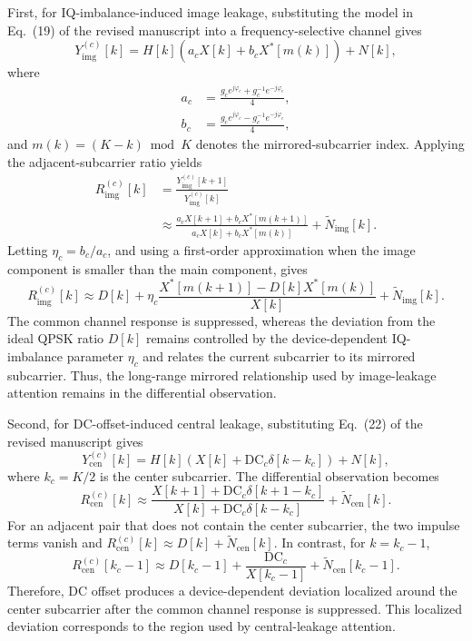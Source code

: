 \documentclass[onecolumn,11pt]{article}
\begin{document}
{First, for IQ-imbalance-induced image leakage, substituting the model in Eq.~(19) of the revised manuscript into a frequency-selective channel gives
\begin{equation}
Y_{\mathrm{img}}^{(c)}[k]
=
H[k]\left(a_cX[k]+b_cX^{*}[m(k)]\right)+N[k],
\end{equation}
where
\begin{equation}
\begin{aligned}
a_c&=\frac{g_ce^{j\varphi_c}+g_c^{-1}e^{-j\varphi_c}}{4},\\
b_c&=\frac{g_ce^{j\varphi_c}-g_c^{-1}e^{-j\varphi_c}}{4},
\end{aligned}
\end{equation}
and $m(k)=(K-k)\bmod K$ denotes the mirrored-subcarrier index. Applying the adjacent-subcarrier ratio yields
\begin{equation}
\begin{aligned}
R_{\mathrm{img}}^{(c)}[k]
&=
\frac{Y_{\mathrm{img}}^{(c)}[k+1]}
{Y_{\mathrm{img}}^{(c)}[k]}\\
&\approx
\frac{a_cX[k+1]+b_cX^{*}[m(k+1)]}
{a_cX[k]+b_cX^{*}[m(k)]}
+\widetilde{N}_{\mathrm{img}}[k].
\end{aligned}
\end{equation}
Letting $\eta_c=b_c/a_c$, and using a first-order approximation when the image component is smaller than the main component, gives
\begin{equation}
R_{\mathrm{img}}^{(c)}[k]
\approx
D[k]
+\eta_c\frac{X^{*}[m(k+1)]-D[k]X^{*}[m(k)]}{X[k]}
+\widetilde{N}_{\mathrm{img}}[k].
\end{equation}
The common channel response is suppressed, whereas the deviation from the ideal QPSK ratio $D[k]$ remains controlled by the device-dependent IQ-imbalance parameter $\eta_c$ and relates the current subcarrier to its mirrored subcarrier. Thus, the long-range mirrored relationship used by image-leakage attention remains in the differential observation.

Second, for DC-offset-induced central leakage, substituting Eq.~(22) of the revised manuscript gives
\begin{equation}
Y_{\mathrm{cen}}^{(c)}[k]
=
H[k]\left(X[k]+\mathrm{DC}_c\delta[k-k_c]\right)+N[k],
\end{equation}
where $k_c=K/2$ is the center subcarrier. The differential observation becomes
\begin{equation}
R_{\mathrm{cen}}^{(c)}[k]
\approx
\frac{X[k+1]+\mathrm{DC}_c\delta[k+1-k_c]}
{X[k]+\mathrm{DC}_c\delta[k-k_c]}
+\widetilde{N}_{\mathrm{cen}}[k].
\end{equation}
For an adjacent pair that does not contain the center subcarrier, the two impulse terms vanish and $R_{\mathrm{cen}}^{(c)}[k]\approx D[k]+\widetilde{N}_{\mathrm{cen}}[k]$. In contrast, for $k=k_c-1$,
\begin{equation}
R_{\mathrm{cen}}^{(c)}[k_c-1]
\approx
D[k_c-1]
+\frac{\mathrm{DC}_c}{X[k_c-1]}
+\widetilde{N}_{\mathrm{cen}}[k_c-1].
\end{equation}
Therefore, DC offset produces a device-dependent deviation localized around the center subcarrier after the common channel response is suppressed. This localized deviation corresponds to the region used by central-leakage attention.

}
\end{document}
